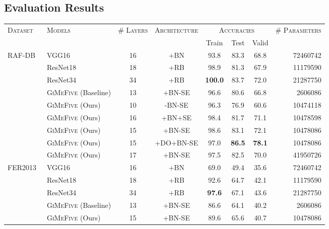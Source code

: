 \subsection{Evaluation Results}
\label{sec:evaluation:results}

\begin{table}[ht]
  \centering
  \begin{tabular}{@{}llcccccr@{}}
    \toprule 
    \multirow{2}{*}{\textsc{Dataset}}&\multirow{2}{*}{\textsc{Models}}&\multirow{2}{*}{\textsc{\# Layers}}&\multirow{2}{*}{\textsc{Architecture}} & \multicolumn{3}{c}{\textsc{Accuracies}} & \multirow{2}{*}{\textsc{\# Parameters}} \\
    \cline{5-7}
    &&&& Train & Test & Valid  &  \\
    \midrule
    \multirow{9}{*}{RAF-DB~\cite{li_reliable_2017,li2019reliable}} &VGG16~\cite{SimonyanZ14a} & 16 &+BN&93.8&83.3&68.8&72460742\\ 
    & ResNet18~\cite{HeZRS16} & 18 & +RB  & 98.9 & 81.3 & 67.9 & 11179590 \\
    & ResNet34~\cite{HeZRS16} & 34 & +RB  & \textbf{100.0} & 83.7 & 72.0 & 21287750 \\
    &\textsc{GiMeFive} (Baseline) & 13 & +BN-SE & 96.6 & 80.6 & 66.8 & 2606086 \\ 
    &\textsc{GiMeFive} (Ours) & 10 & -BN-SE & 96.3 & 76.9 & 60.6 & 10474118 \\
    &\textsc{GiMeFive} (Ours) & 16 & +BN+SE & 98.4 & 81.7 & 71.1 & 10478598 \\
    &\textsc{GiMeFive} (Ours) & 15 & +BN-SE & 98.6 & 83.1 & 72.1 & 10478086 \\
    &\textsc{GiMeFive} (Ours) & 15 & +DO+BN-SE & 97.0 & \textbf{86.5} & \textbf{78.1} & 10478086 \\
    &\textsc{GiMeFive} (Ours) & 17 & +BN-SE & 97.5 & 82.5 & 70.0 & 41950726 \\ 
    \midrule
    \multirow{7}{*}{FER2013~\cite{BarsoumZCZ16}} & VGG16~\cite{SimonyanZ14a} & 16 & +BN & 69.0 & 49.4 & 35.6 & 72460742 \\
    & ResNet18~\cite{HeZRS16} & 18 & +RB  & 92.6 & 64.7 & 42.1 & 11179590 \\
    & ResNet34~\cite{HeZRS16} & 34 & +RB  & \textbf{97.6} & 67.1 & 43.6 & 21287750 \\
    & \textsc{GiMeFive} (Baseline) & 13 & +BN-SE & 86.6 & 64.1 & 40.2 & 2606086 \\
    &\textsc{GiMeFive} (Ours) & 15 & +BN-SE & 89.6 & 65.6 & 40.7 & 10478086 \\

\end{tabular}
\end{table}
